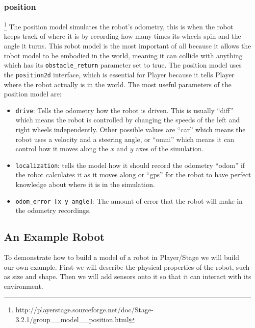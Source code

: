 \documentclass[a4paper]{report}
\newcommand{\plst}{Player/Stage\xspace}
\newcommand{\pl}{Player\xspace}
\begin{document}
\subsubsection{position}\footnote{http://playerstage.sourceforge.net/doc/Stage-3.2.1/group\_\_model\_\_position.html}\label{sec:position}
The position model simulates the robot's odometry, this is when the robot keeps track of where it is by recording how many times its wheels spin and the angle it turns. This robot model is the most important of all because it allows the robot model to be embodied in the world, meaning it can collide with anything which has its \verb|obstacle_return| parameter set to true. The position model uses the \verb|position2d| interface, which is essential for \pl because it tells \pl where the robot actually is in the world.
The most useful parameters of the position model are:
\begin{itemize}
\item \verb|drive|: Tells the odometry how the robot is driven. This is usually ``diff'' which means the robot is controlled by changing the speeds of the left and right wheels independently. Other possible values are ``car'' which means the robot uses a velocity and a steering angle, or ``omni'' which means it can control how it moves along the $x$ and $y$ axes of the simulation.
\item \verb|localization|: tells the model how it should record the odometry ``odom'' if the robot calculates it as it moves along or ``gps'' for the robot to have perfect knowledge about where it is in the simulation. 
\item \verb|odom_error [x y angle]|: The amount of error that the robot will make in the odometry recordings.
\end{itemize}


\subsection{An Example Robot} \label{sec:exampleRobot}

To demonstrate how to build a model of a robot in \plst we will build our own example. First we will describe the physical properties of the robot, such as size and shape. Then we will add sensors onto it so that it can interact with its environment.
\end{document}
